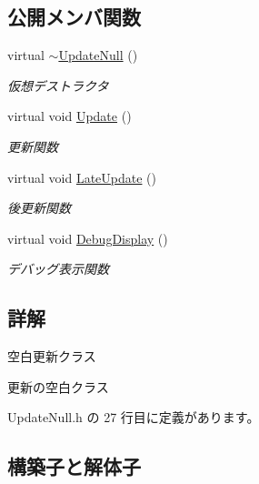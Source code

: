 \subsection*{公開メンバ関数}
\begin{DoxyCompactItemize}
\item 
virtual \mbox{\hyperlink{class_update_null_a121a3045119935eb2704ef282bba2f9f}{$\sim$\+Update\+Null}} ()
\begin{DoxyCompactList}\small\item\em 仮想デストラクタ \end{DoxyCompactList}\item 
virtual void \mbox{\hyperlink{class_update_null_a692f4f34e4ef35ca286a1d3606fdf473}{Update}} ()
\begin{DoxyCompactList}\small\item\em 更新関数 \end{DoxyCompactList}\item 
virtual void \mbox{\hyperlink{class_update_null_ac68da1ba7f3fbcae833442bb1c169200}{Late\+Update}} ()
\begin{DoxyCompactList}\small\item\em 後更新関数 \end{DoxyCompactList}\item 
virtual void \mbox{\hyperlink{class_update_null_a77aee1e614cf6dafe4f9af58b2205e4b}{Debug\+Display}} ()
\begin{DoxyCompactList}\small\item\em デバッグ表示関数 \end{DoxyCompactList}\end{DoxyCompactItemize}


\subsection{詳解}
空白更新クラス 

更新の空白クラス 

 Update\+Null.\+h の 27 行目に定義があります。



\subsection{構築子と解体子}
\mbox{\label{class_update_null_a121a3045119935eb2704ef282bba2f9f}} 
